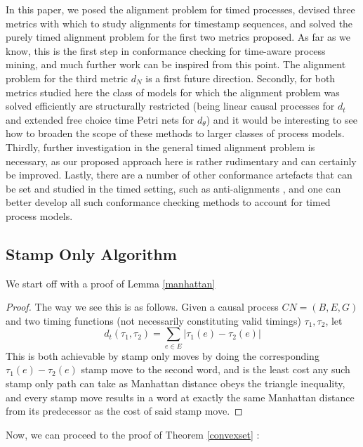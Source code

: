 \documentclass[conference]{IEEEtran}
\begin{document}
	In this paper, we posed the alignment problem for timed processes, devised three metrics with which to study alignments for timestamp sequences, and solved the purely timed alignment problem for the first two metrics proposed. As far as we know, this is the first step in conformance checking for time-aware process mining, and much further work can be inspired from this point. The alignment problem for the third metric $d_N$ is a first future direction. Secondly, for both metrics studied here the class of models for which the alignment problem was solved efficiently are structurally restricted (being linear causal processes for $d_t$ and extended free choice time Petri nets for $d_\theta$) and it would be interesting to see how to broaden the scope of these methods to larger classes of process models. Thirdly, further investigation in the general timed alignment problem is necessary, as our proposed approach here is rather rudimentary and can certainly be improved. Lastly, there are a number of other conformance artefacts that can be set and studied in the timed setting, such as anti-alignments \cite{CBC21}, and one can better develop all such conformance checking methods to account for timed process models.
	
	
	
	\clearpage
	\appendix 
	\subsection{Stamp Only Algorithm}
	We start off with a proof of Lemma \ref{manhattan}
	
	\begin{proof}
		The way we see this is as follows. 
		Given a causal process $CN = (B, E, G)$ and two timing functions (not necessarily constituting valid timings) $\tau_1, \tau_2$, let $$d_t(\tau_1, \tau_2) = \sum_{e \in E} |\tau_1(e) - \tau_2(e)|$$
		This is both achievable by stamp only moves by doing the corresponding $\tau_1(e) - \tau_2(e)$ stamp move to the second word, and is the least cost any such stamp only path can take as Manhattan distance obeys the triangle inequality, and every stamp move results in a word at exactly the same Manhattan distance from its predecessor as the cost of said stamp move. 
		
	\end{proof}
	
	Now, we can proceed to the proof of Theorem \ref{convexset} : 
	
\end{document}
